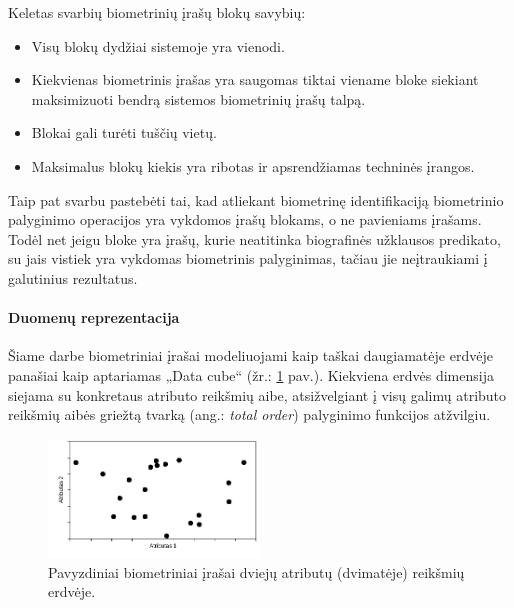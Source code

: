 Keletas svarbių biometrinių įrašų blokų savybių:
\begin{itemize}
\item Visų blokų dydžiai sistemoje yra vienodi.
\item Kiekvienas biometrinis įrašas yra saugomas tiktai viename bloke siekiant maksimizuoti bendrą sistemos biometrinių įrašų talpą.
\item Blokai gali turėti tuščių vietų.
\item Maksimalus blokų kiekis yra ribotas ir apsrendžiamas techninės įrangos.
\end{itemize}

Taip pat svarbu pastebėti tai, kad atliekant biometrinę identifikaciją biometrinio palyginimo operacijos yra vykdomos įrašų blokams, o ne pavieniams įrašams.
Todėl net jeigu bloke yra įrašų, kurie neatitinka biografinės užklausos predikato, su jais vistiek yra vykdomas biometrinis palyginimas, tačiau jie neįtraukiami į galutinius rezultatus.


\paragraph{Duomenų reprezentacija}

Šiame darbe biometriniai įrašai modeliuojami kaip taškai daugiamatėje erdvėje panašiai kaip \cite{marcel2000modeling} aptariamas „Data cube“ (žr.: \ref{img:multidimensionalGallery} pav.).
Kiekviena erdvės dimensija siejama su konkretaus atributo reikšmių aibe, atsižvelgiant į visų galimų atributo reikšmių aibės griežtą tvarką (ang.: {\it total order}) palyginimo funkcijos atžvilgiu.

\begin{figure}[H]
\begin{center}
\includegraphics[width=0.5\textwidth]{img/MultidimensionalGallery.png}
\caption{Pavyzdiniai biometriniai įrašai dviejų atributų (dvimatėje) reikšmių erdvėje.}
\label{img:multidimensionalGallery}
\end{center}
\end{figure}

